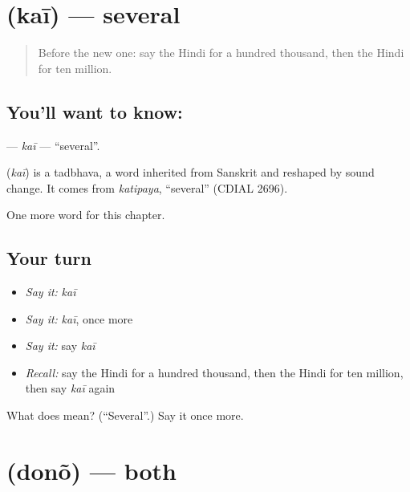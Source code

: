 \section[\texorpdfstring{\hi{कई} (kaī)}{कई (kaī)}]{ (kaī) — several}

\label{lesson:HI-C244-kai}



\begin{quote}
Before the new one: say the Hindi for a hundred thousand, then the Hindi for ten million.
\end{quote}

\subsection*{You'll want to know: }
\textbf{} — \emph{kaī} — \textquotedblleft{}several\textquotedblright{}.

\begin{cousinweb}
\textbf{} (\emph{kaī}) is a tadbhava, a word inherited from Sanskrit and reshaped by sound change. It comes from \emph{katipaya}, \textquotedblleft{}several\textquotedblright{} (CDIAL 2696).
\end{cousinweb}

\begin{grammarlens}[title={What you've built}]
One more word for this chapter.
\end{grammarlens}

\subsection*{Your turn}
\begin{itemize}
\raggedright
  \item \emph{Say it:} \emph{kaī}
  \item \emph{Say it:} \emph{kaī}, once more
  \item \emph{Say it:} say \emph{kaī}
  \item \emph{Recall:} say the Hindi for a hundred thousand, then the Hindi for ten million, then say \emph{kaī} again
\end{itemize}

\begin{tcolorbox}[breakable,colback=teal!4,colframe=teal!35!black,title={Before you move on}]
What does  mean? (\textquotedblleft{}Several\textquotedblright{}.) Say it once more.
\end{tcolorbox}
\section[\texorpdfstring{\hi{दोनों} (donõ)}{दोनों (donõ)}]{ (donõ) — both}

